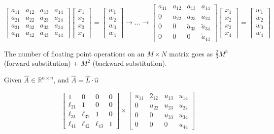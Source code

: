 \documentclass[10pt]{article} %
\begin{document}
\[ \left[ \begin{array}{cccc} a_{11} & a_{12} & a_{13}&a_{14} \\ a_{21}&a_{22}&a_{23}&a_{24} \\ a_{31}&a_{32}&a_{33}&a_{34} \\a_{41}&a_{42}&a_{43}&a_{44} \end{array} \right] \left[ \begin{array}{c} x_1 \\ x_2 \\ x_3 \\ x_4 \end{array} \right] = \left[ \begin{array}{c} w_1\\w_2\\w_3\\w_4 \end{array} \right] \longrightarrow \dots \longrightarrow \left[ \begin{array}{cccc} a_{11} & a_{12}&a_{13}&a_{14}  \\ 0&\tilde{a}_{22}&\tilde{a}_{23}&\tilde{a}_{24}  \\ 0&0&\tilde{a}_{33}&\tilde{a}_{34}    \\ 0&0&0& \tilde{a}_{44}    \end{array} \right] \left[ \begin{array}{c} x_1 \\ x_2 \\ x_3 \\ x_4 \end{array} \right] = \left[ \begin{array}{c} w_1\\w_2\\w_3\\w_4 \end{array} \right] \]

The number of floating point operations on an $M\times N$ matrix goes as $\frac{2}{3} M^3$ (forward substitution) + $M^2$ (backward substitution).

Given $\hat{A} \in \mathbb{R}^{n \times n}$, and $\hat{A} = \hat{L} \cdot \hat{u}$

\[ \left[ \begin{array}{cccc} 1&0&0&0 \\ \ell_{21} &1&0&0 \\ \ell_{31} & \ell_{32} &1&0 \\ \ell_{41} & \ell_{42} & \ell_{43} &1 \end{array} \right] \times \left[ \begin{array}{cccc} u_{11}&2_{12}&u_{13}&u_{14} \\ 0&u_{22}&u_{23}&u_{24} \\ 0&0&u_{33} &u_{34} \\ 0&0&0&u_{44} \end{array} \right] \]
 
\end{document}
